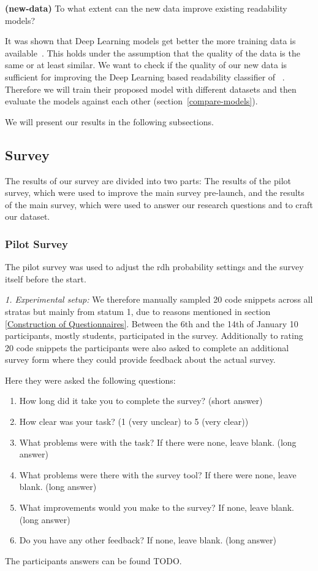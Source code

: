 \documentclass[%
class=scrreprt,
chapterprefix=false,%
open=right,%
twoside=false,%
paper=a4,%
logofile={Logo\_zentral\_farbig\_EN.png},%
thesistype=master,%
UKenglish,%
]{se2thesis}
\theoremstyle{definition}
\begin{document}
	\begin{resq} \textbf{(new-data)} To what extent can the new data improve existing readability models?\end{resq} \label{new-data}
	It was shown that Deep Learning models get better the more training data is available~\cite{hestness2017deep}. This holds under the assumption that the quality of the data is the same or at least similar. We want to check if the quality of our new data is sufficient for improving the Deep Learning based readability classifier of \citeauthor{mi2022towards}~\cite{mi2022towards}. Therefore we will train their proposed model with different datasets and then evaluate the models against each other (section~\ref{compare-models}).

	We will present our results in the following subsections.

\subsection{Survey} \label{Survey}
	The results of our survey are divided into two parts: The results of the pilot survey, which were used to improve the main survey pre-launch, and the results of the main survey, which were used to answer our research questions and to craft our dataset.
	
\subsubsection{Pilot Survey} \label{Pilot Survey}
	The pilot survey was used to adjust the rdh probability settings and the survey itself before the start. 
	
	\textit{1. Experimental setup:}
	We therefore manually sampled 20 code snippets across all stratas but mainly from statum 1, due to reasons mentioned in section \ref{Construction of Questionnaires}. Between the 6th and the 14th of January 10 participants, mostly students, participated in the survey. Additionally to rating 20 code snippets the participants were also asked to complete an additional survey form where they could provide feedback about the actual survey.
	
	Here they were asked the following questions:
	\begin{enumerate}
		\item How long did it take you to complete the survey? (short answer)
		\item How clear was your task? (1 (very unclear) to 5 (very clear))
		\item What problems were with the task? If there were none, leave blank. (long answer)
		\item What problems were there with the survey tool? If there were none, leave blank.  (long answer)
		\item What improvements would you make to the survey? If none, leave blank.  (long answer)
		\item Do you have any other feedback? If none, leave blank. (long answer)
	\end{enumerate}
	The participants answers can be found TODO.
	
\end{document}
